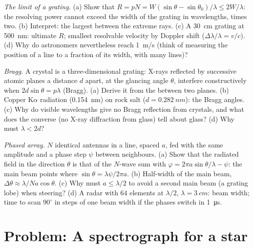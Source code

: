 \begin{exercise}[$\star\star\star$]\label{exo:b2:gratings:10}
\emph{The limit of a grating.} (a) Show that $R = pN = W(\sin\theta - \sin\theta_0)
/\lambda \le 2W/\lambda$: the resolving power cannot exceed the width of the
grating in wavelengths, times two. (b) Interpret: the largest  between the extreme rays. (c) A \qty{30}{cm} grating at
\qty{500}{nm}: ultimate $R$; smallest resolvable velocity by Doppler shift
($\Delta\lambda/\lambda = v/c$). (d) Why do astronomers nevertheless reach \qty{1}{m/s}
(think of measuring the position of a line to a fraction of its width,
with many lines)?
\end{exercise}

\begin{exercise}[$\star\star\star$]\label{exo:b2:gratings:11}
\emph{Bragg.} A crystal is a three-dimensional grating: X-rays
reflected by successive atomic planes a distance $d$ apart, at the
glancing angle $\theta$, interfere constructively when $2d\sin\theta = p\lambda$
(Bragg). (a) Derive it from the  between two planes.
(b) Copper K$\alpha$ radiation (\qty{0.154}{nm}) on rock salt ($d = \qty{0.282}{nm}$):
the Bragg angles. (c) Why do visible wavelengths give no Bragg
reflection from crystals, and what does the converse (no X-ray
diffraction from glass) tell about glass? (d) Why must $\lambda < 2d$?
\end{exercise}

\begin{exercise}[$\star\star\star$]\label{exo:b2:gratings:12}
\emph{Phased array.} $N$ identical antennas in a line, spaced $a$, fed
with the same amplitude and a phase step $\psi$ between neighbours. (a)
Show that the radiated field in the direction $\theta$ is that of the
$N$-wave sum with $\varphi = 2\pi a\sin\theta/\lambda - \psi$: the main beam points
where $\sin\theta = \lambda\psi/2\pi a$. (b) Half-width of the main beam, $\Delta\theta
\approx \lambda/Na\cos\theta$. (c) Why must $a \le \lambda/2$ to avoid a second main beam
(a grating lobe) when steering? (d) A radar with $64$ elements at
$\lambda/2$, $\lambda = \qty{3}{cm}$: beam width; time to scan $90^\circ$ in steps of one
beam width if the phases switch in \qty{1}{\micro s}.
\end{exercise}

\section{Problem: A spectrograph for a star}

